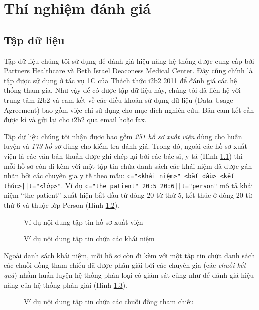 \chapter{Thí nghiệm đánh giá}
\section{Tập dữ liệu}
Tập dữ liệu chúng tôi sử dụng để đánh giá hiệu năng hệ thống được cung cấp bởi Partners Healthcare và Beth Israel Deaconess Medical Center. Đây cũng chính là tập được sử dụng ở tác vụ 1C của Thách thức i2b2 2011 để đánh giá các hệ thống tham gia. Như vậy để có được tập dữ liệu này, chúng tôi đã liên hệ với trung tâm i2b2 và cam kết về các điều khoản sử dụng dữ liệu (Data Usage Agreement) bao gồm việc chỉ sử dụng cho mục đích nghiên cứu. Bản cam kết cần được kí và gửi lại cho i2b2 qua email hoặc fax.

Tập dữ liệu chúng tôi nhận được bao gồm \emph{251 hồ sơ xuất viện} dùng cho huấn luyện và \emph{173 hồ sơ} dùng cho kiểm tra đánh giá. Trong đó, ngoài các hồ sơ xuất viện là các văn bản thuần được ghi chép lại bởi các bác sĩ, y tá (Hình \ref{hsxv-eg}) thì mỗi hồ sơ còn đi kèm với một tập tin chứa danh sách các khái niệm đã được gán nhãn bởi các chuyên gia y tế theo mẫu: \texttt{c="<khái niệm>" <bắt đầu> <kết thúc>||t="<lớp>"}. Ví dụ \texttt{c="the patient" 20:5 20:6||t="person"} mô tả khái niệm ``the patient'' xuất hiện bắt đầu từ dòng 20 từ thứ 5, kết thúc ở dòng 20 từ thứ 6 và thuộc lớp Person (Hình \ref{con-eg}).

\begin{figure}[ht]
\centering

\caption{Ví dụ nội dung tập tin hồ sơ xuất viện\label{hsxv-eg}}
\end{figure}

\begin{figure}[ht]

\caption{Ví dụ nội dung tập tin chứa các khái niệm\label{con-eg}}
\end{figure}

Ngoài danh sách khái niệm, mỗi hồ sơ còn đi kèm với một tập tin chứa danh sách các chuỗi đồng tham chiếu đã được phân giải bởi các chuyên gia (các \emph{chuỗi kết quả}) nhằm huấn luyện hệ thống phân loại có giám sát cũng như để đánh giá hiệu năng của hệ thống phân giải (Hình \ref{chains-eg}).

\begin{figure}[ht]

\caption{Ví dụ nội dung tập tin chứa các chuỗi đồng tham chiếu\label{chains-eg}}
\end{figure}

